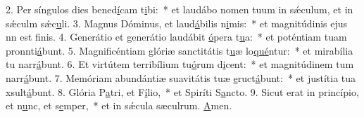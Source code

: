 2. Per síngulos dies bened\uline{í}cam t\uline{i}bi:~* et laudábo nomen tuum in sǽculum, et in sǽculm sǽc\uline{u}li.
3. Magnus Dóminus, et laud\uline{á}bilis n\uline{i}mis:~* et magnitúdinis ejus nn est f\uline{i}nis.
4. Generátio et generátio laudábit \uline{ó}pera t\uline{u}a:~* et poténtiam tuam pronnti\uline{á}bunt.
5. Magnificéntiam glóriæ sanctitátis t\uline{u}æ lo\uline{qué}ntur:~* et mirabília tu narr\uline{á}bunt.
6. Et virtútem terribílium tu\uline{ó}rum d\uline{i}cent:~* et magnitúdinem tum narr\uline{á}bunt.
7. Memóriam abundántiæ suavitátis tuæ \uline{e}ruct\uline{á}bunt:~* et justítia tua xsult\uline{á}bunt.
8. Glória P\uline{a}tri, et F\uline{í}lio,~* et Spiríti S\uline{a}ncto.
9. Sicut erat in princípio, et n\uline{u}nc, et s\uline{e}mper,~* et in sǽcula sæculrum. \uline{A}men.
